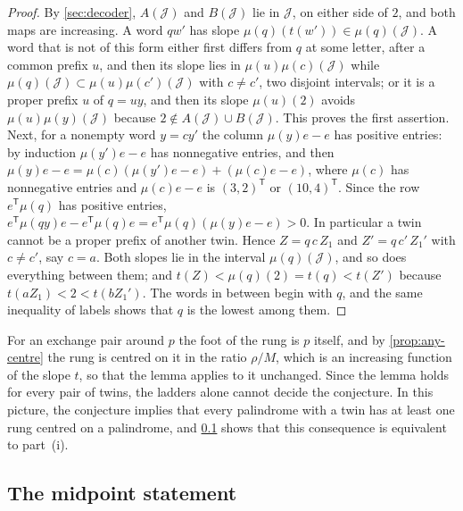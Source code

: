 \begin{proof}
By \cref{sec:decoder}, $A(\mathcal J)$ and $B(\mathcal J)$ lie in $\mathcal J$, on either side
of $2$, and both maps are increasing. A word $qw'$ has slope
$\mu(q)(t(w'))\in\mu(q)(\mathcal J)$. A word that is not of this form either first differs
from $q$ at some letter, after a common prefix $u$, and then its slope lies in
$\mu(u)\mu(c)(\mathcal J)$ while $\mu(q)(\mathcal J)\subset\mu(u)\mu(c')(\mathcal J)$ with
$c\neq c'$, two disjoint intervals; or it is a proper prefix $u$ of $q=uy$, and then its
slope $\mu(u)(2)$ avoids $\mu(u)\mu(y)(\mathcal J)$ because $2\notin A(\mathcal J)\cup B(\mathcal J)$.
This proves the first assertion. Next, for a nonempty word $y=cy'$ the column $\mu(y)e-e$
has positive entries: by induction $\mu(y')e-e$ has nonnegative entries, and then
$\mu(y)e-e=\mu(c)(\mu(y')e-e)+(\mu(c)e-e)$, where $\mu(c)$ has nonnegative entries and
$\mu(c)e-e$ is $(3,2)^{\mathsf T}$ or $(10,4)^{\mathsf T}$. Since the row $e^{\mathsf T}\mu(q)$ has
positive entries, $e^{\mathsf T}\mu(qy)e-e^{\mathsf T}\mu(q)e=e^{\mathsf T}\mu(q)(\mu(y)e-e)>0$.
In particular a twin cannot be a proper prefix of another twin. Hence $Z=q\,c\,Z_1$ and $Z'=q\,c'\,Z_1'$ with $c\neq c'$, say $c=a$. Both slopes
lie in the interval $\mu(q)(\mathcal J)$, and so does everything between them; and
$t(Z)<\mu(q)(2)=t(q)<t(Z')$ because $t(aZ_1)<2<t(bZ_1')$. The words in between begin with $q$,
and the same inequality of labels shows that $q$ is the lowest among them.
\end{proof}

For an exchange pair around $p$ the foot of the rung is $p$ itself, and by
\cref{prop:any-centre} the rung is centred on it in the ratio $\rho/M$, which is an increasing
function of the slope $t$, so that the lemma applies to it unchanged. Since the lemma holds for
every pair of twins, the ladders alone cannot decide the conjecture. In this picture, the
conjecture implies that every palindrome with a twin has at least one rung centred on a
palindrome, and \cref{subsec:centre-decoding} shows that this consequence is equivalent to
part~(i).

\subsection{The midpoint statement}
\label{subsec:centre-decoding}

